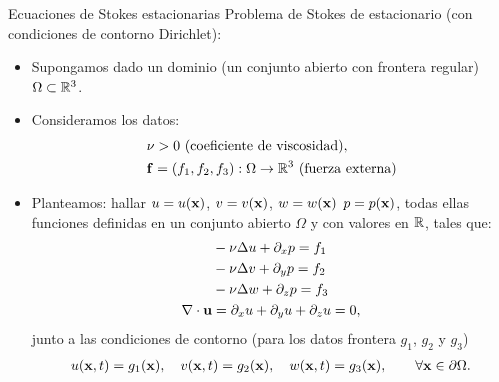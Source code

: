 \documentclass[8pt]{beamer}
\begin{document}
\begin{frame}{Ecuaciones de Stokes estacionarias}
  \alert{Problema de Stokes de estacionario} (con condiciones de contorno \alert{Dirichlet}):

  \begin{itemize}


  \item Supongamos dado un dominio (un conjunto abierto con frontera
    regular) $\Omega\subset {\mathbb R}^3$.
  \item Consideramos los datos:
    \begin{align}
      &\nu>0 \ \text{(coeficiente de viscosidad)},\\
      &\mathbf{f}=(f_1,f_2,f_3):\Omega \to {\mathbb R}^3 \ \text{(fuerza externa)}
    \end{align}

  \item Planteamos: hallar $u=u(\mathbf{x})$, $v=v(\mathbf{x})$, $w=w(\mathbf{x})$
    $p=p(\mathbf{x})$, todas ellas funciones definidas en un conjunto
    abierto $\Omega$ y con valores en ${\mathbb R}$, tales que:
    \begin{align}
      &- \nu\Delta u + \partial_x p = f_1
      \\
      &- \nu\Delta v + \partial_y p = f_2
      \\
      &- \nu\Delta w + \partial_z p = f_3
      \\
      \nabla\cdot{}\mathbf{u} &= \partial_x u + \partial_y u + \partial_z u = 0,
    \end{align}
    junto a las condiciones de contorno (para los datos frontera $g_1$, $g_2$ y $g_3$)
    \begin{align}
      u(\mathbf{x},t)=g_1(\mathbf{x}),
      \quad
      v(\mathbf{x},t)=g_2(\mathbf{x}),
      \quad
      w(\mathbf{x},t)=g_3(\mathbf{x}),
      \qquad
    \forall \mathbf{x}\in\partial\Omega.
    \end{align}
  \end{itemize}

\end{frame}
\end{document}
